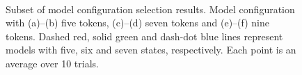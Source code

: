 \begin{figure}[t]
    \\

    \caption[Subset of model configuration selection results.]{\small
        Subset of model configuration selection results.  Model
        configuration with (a)--(b) five tokens, (c)--(d) seven tokens 
        and (e)--(f) nine tokens. Dashed red, solid green and dash-dot blue 
        lines represent models with five, six and seven states, respectively.  
        Each point is an average over 10 trials.}
    \label{fig:batch-some-clustering-results}
\end{figure}


